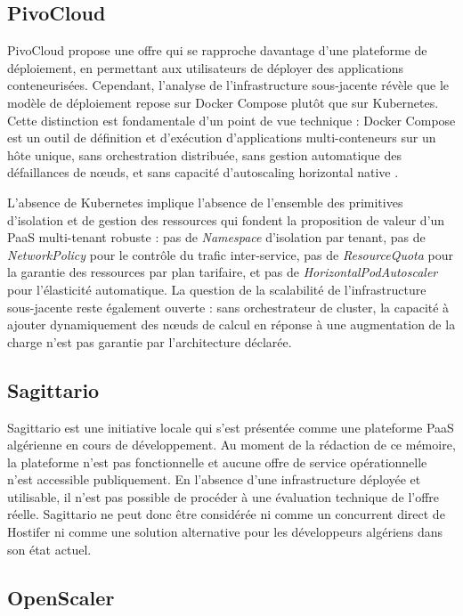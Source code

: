 \subsection*{PivoCloud}

PivoCloud propose une offre qui se rapproche davantage d'une plateforme de déploiement, en permettant aux utilisateurs de déployer des applications conteneurisées. Cependant, l'analyse de l'infrastructure sous-jacente révèle que le modèle de déploiement repose sur Docker Compose plutôt que sur Kubernetes. Cette distinction est fondamentale d'un point de vue technique : Docker Compose est un outil de définition et d'exécution d'applications multi-conteneurs sur un hôte unique, sans orchestration distribuée, sans gestion automatique des défaillances de nœuds, et sans capacité d'autoscaling horizontal native \cite{docker-docs}.

L'absence de Kubernetes implique l'absence de l'ensemble des primitives d'isolation et de gestion des ressources qui fondent la proposition de valeur d'un PaaS multi-tenant robuste : pas de \textit{Namespace} d'isolation par tenant, pas de \textit{NetworkPolicy} pour le contrôle du trafic inter-service, pas de \textit{ResourceQuota} pour la garantie des ressources par plan tarifaire, et pas de \textit{HorizontalPodAutoscaler} pour l'élasticité automatique. La question de la scalabilité de l'infrastructure sous-jacente reste également ouverte : sans orchestrateur de cluster, la capacité à ajouter dynamiquement des nœuds de calcul en réponse à une augmentation de la charge n'est pas garantie par l'architecture déclarée.

\subsection*{Sagittario}

Sagittario est une initiative locale qui s'est présentée comme une plateforme PaaS algérienne en cours de développement. Au moment de la rédaction de ce mémoire, la plateforme n'est pas fonctionnelle et aucune offre de service opérationnelle n'est accessible publiquement. En l'absence d'une infrastructure déployée et utilisable, il n'est pas possible de procéder à une évaluation technique de l'offre réelle. Sagittario ne peut donc être considérée ni comme un concurrent direct de Hostifer ni comme une solution alternative pour les développeurs algériens dans son état actuel.

\subsection*{OpenScaler}


